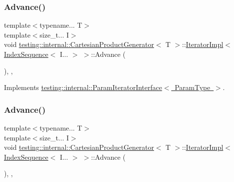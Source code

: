 \subsubsection{\texorpdfstring{Advance()}{Advance()}\hspace{0.1cm}{\footnotesize\ttfamily [1/2]}}
{\footnotesize\ttfamily template$<$typename... T$>$ \\
template$<$size\+\_\+t... I$>$ \\
void \mbox{\hyperlink{classtesting_1_1internal_1_1_cartesian_product_generator}{testing\+::internal\+::\+Cartesian\+Product\+Generator}}$<$ T $>$\+::\mbox{\hyperlink{classtesting_1_1internal_1_1_cartesian_product_generator_1_1_iterator_impl}{Iterator\+Impl}}$<$ \mbox{\hyperlink{structtesting_1_1internal_1_1_index_sequence}{Index\+Sequence}}$<$ I... $>$ $>$\+::Advance (\begin{DoxyParamCaption}{ }\end{DoxyParamCaption})\hspace{0.3cm}{\ttfamily [inline]}, {\ttfamily [override]}, {\ttfamily [virtual]}}



Implements \mbox{\hyperlink{classtesting_1_1internal_1_1_param_iterator_interface_a600dbd35fcb551463e379516a1abea48}{testing\+::internal\+::\+Param\+Iterator\+Interface$<$ Param\+Type $>$}}.

\mbox{\label{classtesting_1_1internal_1_1_cartesian_product_generator_1_1_iterator_impl_3_01_index_sequence_3_01_i_8_8_8_01_4_01_4_a167e8b38118c8635d5849daf924a517b}} 
\subsubsection{\texorpdfstring{Advance()}{Advance()}\hspace{0.1cm}{\footnotesize\ttfamily [2/2]}}
{\footnotesize\ttfamily template$<$typename... T$>$ \\
template$<$size\+\_\+t... I$>$ \\
void \mbox{\hyperlink{classtesting_1_1internal_1_1_cartesian_product_generator}{testing\+::internal\+::\+Cartesian\+Product\+Generator}}$<$ T $>$\+::\mbox{\hyperlink{classtesting_1_1internal_1_1_cartesian_product_generator_1_1_iterator_impl}{Iterator\+Impl}}$<$ \mbox{\hyperlink{structtesting_1_1internal_1_1_index_sequence}{Index\+Sequence}}$<$ I... $>$ $>$\+::Advance (\begin{DoxyParamCaption}{ }\end{DoxyParamCaption})\hspace{0.3cm}{\ttfamily [inline]}, {\ttfamily [override]}, {\ttfamily [virtual]}}



